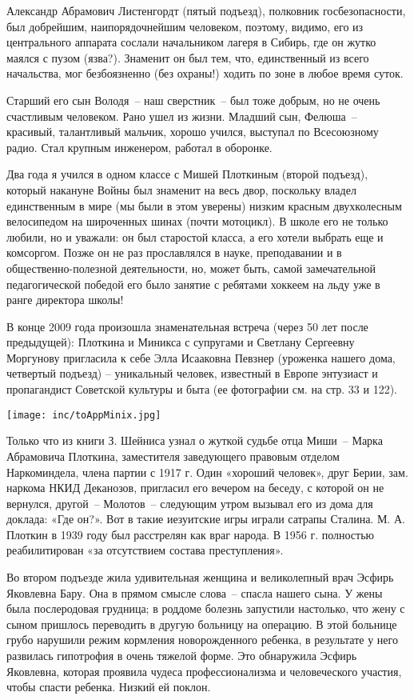 Александр Абрамович Листенгордт (пятый подъезд), полковник госбезопасности, был добрейшим, наипорядочнейшим человеком, поэтому, видимо, его из центрального аппарата  сослали начальником лагеря  в Сибирь, где он жутко маялся с пузом (язва?). Знаменит он был тем, что, единственный из всего начальства, мог безбоязненно (без охраны!) ходить по зоне в любое время суток.


Старший его сын Володя~-- наш сверстник~-- был тоже добрым, но не очень счастливым человеком. Рано ушел из жизни. Младший сын, Фелюша~--  красивый, талантливый мальчик, хорошо учился, выступал по Всесоюзному радио. Стал крупным инженером, работал в оборонке.

Два года я учился в одном классе с Мишей Плоткиным (второй подъезд), который накануне Войны был знаменит на весь двор, поскольку владел единственным в мире (мы были в этом уверены) низким красным двухколесным велосипедом на широченных шинах (почти мотоцикл). В школе его не только любили, но и уважали: он был старостой класса, а его хотели выбрать еще и комсоргом. Позже он не раз прославлялся в науке, преподавании и в общественно-полезной деятельности, но, может быть, самой замечательной педагогической победой его было занятие с ребятами хоккеем на льду уже в ранге директора школы!

В конце 2009 года произошла знаменательная встреча (через 50 лет после предыдущей): Плоткина и Миникса с супругами и Светлану Сергеевну Моргунову пригласила к себе Элла Исааковна Певзнер (уроженка нашего дома, четвертый подъезд) – уникальный человек, известный в Европе энтузиаст и пропагандист Советской культуры и быта (ее фотографии см. на стр. 33 и 122).


\noindent\texttt{[image: inc/toAppMinix.jpg]}

Только что из книги З. Шейниса узнал о жуткой судьбе отца Миши~-- Марка Абрамовича Плоткина, заместителя заведующего правовым отделом Наркоминдела, члена партии с 1917 г. Один «хороший человек», друг Берии, зам. наркома НКИД Деканозов, пригласил его вечером на беседу, с которой он не вернулся, другой~-- Молотов~-- следующим утром вызывал его из дома для доклада: «Где он?». Вот в такие иезуитские игры играли сатрапы Сталина. М. А. Плоткин в 1939 году был расстрелян как враг народа. В 1956 г. полностью реабилитирован «за отсутствием состава преступления».  

Во втором подъезде жила удивительная женщина и великолепный врач Эсфирь Яковлевна Бару. Она в прямом смысле слова~-- спасла нашего сына. У жены была послеродовая грудница; в роддоме болезнь запустили настолько, что жену с сыном пришлось переводить в другую больницу на операцию. В этой больнице грубо нарушили режим кормления новорожденного ребенка, в результате у него развилась гипотрофия в очень тяжелой форме. Это обнаружила Эсфирь Яковлевна, которая проявила чудеса профессионализма и человеческого участия, чтобы спасти ребенка. Низкий ей поклон.

